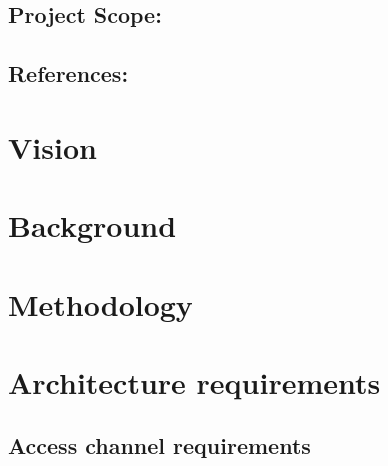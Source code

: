 \documentclass[12pt]{article}
\begin{document}
		\vspace{0.2in}
	
		\subsection{Project Scope:}
		\vspace{0.2in}		
		
		\vspace{0.2in}
	
		\subsection{References:}
		\vspace{0.1in}
			
	
	\vspace{0.5in}
	
	\newpage
	\section{Vision}	
	\vspace{0.2in}
	
	\vspace{0.5in}
	
	\newpage
	\section{Background}
	\vspace{0.2in}
	
	\vspace{0.5in}
	
	\newpage
	\section{Methodology}
	\vspace{0.2in}
	
	\vspace{0.5in}
	
	\newpage
	\section{Architecture requirements}
		\subsection{Access channel requirements}
		\vspace{0.2in}
		
		\vspace{0.2in}
		
\end{document}
